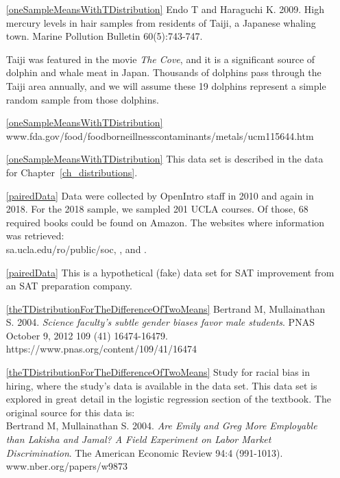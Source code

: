 \begin{itemize}
\item[\ref{oneSampleMeansWithTDistribution}]
    Endo T and Haraguchi K. 2009.
    High mercury levels in hair samples from residents of Taiji,
    a Japanese whaling town.
    Marine Pollution Bulletin 60(5):743-747.

    Taiji was featured in the movie
    \emph{The Cove}, and it is a significant source of dolphin
    and whale meat in Japan.
    Thousands of dolphins pass through the Taiji area annually,
    and we will assume these 19 dolphins represent a simple
    random sample from those dolphins.
\item[\ref{oneSampleMeansWithTDistribution}]
        {www.fda.gov/food/foodborneillnesscontaminants/metals/ucm115644.htm}

\item[\ref{oneSampleMeansWithTDistribution}]
    This data set is described in
    the data for Chapter~\ref{ch_distributions}.

\item[\ref{pairedData}]
    Data were collected by OpenIntro staff in 2010 and again
    in 2018.
    For the 2018 sample, we sampled 201 UCLA courses.
    Of those, 68 required books could be
    found on Amazon.
    The websites where information was retrieved: \\
        {sa.ucla.edu/ro/public/soc},
    ,
    and .

\item[\ref{pairedData}]
    This is a hypothetical (fake) data set for SAT improvement from
    an SAT preparation company.

\item[\ref{theTDistributionForTheDifferenceOfTwoMeans}]
    Bertrand M, Mullainathan S. 2004.
    \emph{Science faculty's subtle gender biases favor male students}.
    PNAS October 9, 2012 109 (41) 16474-16479.\\
        {https://www.pnas.org/content/109/41/16474}

\item[\ref{theTDistributionForTheDifferenceOfTwoMeans}]
    Study for racial bias in hiring, where the study's data is available
    in the  data set.
    This data set is explored in great detail in the logistic regression
    section of the  textbook.
    The original source for this data is:\\
    Bertrand M, Mullainathan S. 2004.
    \emph{Are Emily and Greg More Employable than Lakisha and Jamal?
    A Field Experiment on Labor Market Discrimination}.
    The American Economic Review 94:4 (991-1013).
        {www.nber.org/papers/w9873}


\end{itemize}
